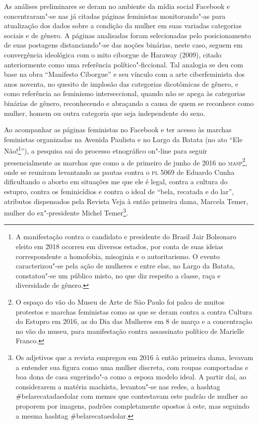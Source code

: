 As análises preliminares se deram no ambiente da mídia social Facebook e
concentraram"-se nas já citadas páginas feministas monitorando"-as para
atualização dos dados sobre a condição da mulher em suas variadas
categorias sociais e de gênero. A páginas analisadas foram selecionadas
pelo posicionamento de suas postagens distanciando"-se das noções
binárias, neste caso, seguem em convergência ideológica com o mito
ciborgue de Haraway (2009), citado anteriormente como uma referência
político"-ficcional. Tal analogia se deu com base na obra ``Manifesto
Ciborgue'' e seu vínculo com a arte ciberfeminista dos anos noventa, no
quesito de implosão das categorias dicotômicas de gênero, e como
referência ao feminismo interseccional, quando não se apega às
categorias binárias de gênero, reconhecendo e abraçando a causa de quem
se reconhece como mulher, homem ou outra categoria que seja independente
do sexo.

Ao acompanhar as páginas feministas no Facebook e ter acesso às marchas
feministas organizadas na Avenida Paulista e no Largo da Batata (no ato
``Ele Não!\footnote{A manifestação contra o candidato e presidente do
  Brasil Jair Bolsonaro eleito em 2018 ocorreu em diversos estados, por
  conta de suas ideias correspondente a homofobia, misoginia e o
  autoritarismo. O evento caracterizou"-se pela ação de mulheres e entre
  elas, no Largo da Batata, constatou"-se um público misto, no que diz
  respeito a classe, raça e diversidade de gênero.}''), a pesquisa sai
do processo etnográfico on"-line para seguir presencialmente as marchas
que como a de primeiro de junho de 2016 no \textsc{masp}\footnote{O espaço do vão
  do Museu de Arte de São Paulo foi palco de muitos protestos e marchas
  feministas como as que se deram contra a contra Cultura do Estupro em
  2016, as do Dia das Mulheres em 8 de março e a concentração no vão do
  museu, para manifestação contra assassinato político de Marielle
  Franco.}, onde se reuniram levantando as pautas contra o \textsc{pl} 5069 de
Eduardo Cunha dificultando o aborto em situações me que ele é legal,
contra a cultura do estupro, contra os feminicídios e contra o ideal de
``bela, recatada e do lar'', atributos dispensados pela Revista Veja à
então primeira dama, Marcela Temer, mulher do ex"-presidente Michel
Temer\footnote{Os adjetivos que a revista empregou em 2016 à então
  primeira dama, levavam a entender sua figura como uma mulher discreta,
  com roupas comportadas e boa dona de casa sugerindo"-a como a esposa
  modelo ideal. A partir daí, ao considerarem a matéria machista,
  levantou"-se nas redes, a hashtag \#belarecatadaedolar com memes que
  contestavam este padrão de mulher ao proporem por imagens, padrões
  completamente opostos à este, mas seguindo a mesma hashtag
  \#belarecataedolar.}.

